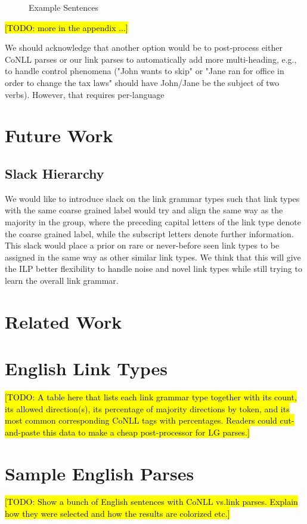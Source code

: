 \documentclass[11pt]{article}
\newcommand{\Note}[1]{}
\renewcommand{\Note}[1]{\hl{[#1]}}  %
\newcommand{\TODO}[1]{\Note{TODO: #1}}
\begin{document}
\begin{figure}[ht!]
  \centering
  
  \caption{Example Sentences}
\end{figure}

\TODO{more in the appendix ...}

We should acknowledge that another option would be to post-process either CoNLL parses or our link parses to automatically add more multi-heading, e.g., to handle control phenomena ("John wants to skip" or "Jane ran for office in order to change the tax laws" should have John/Jane be the subject of two verbs).  However, that requires per-language 



\section{Future Work}

\subsection{Slack Hierarchy}
We would like to introduce slack on the link grammar types such that link types with the same coarse grained label would try and align the same way as the majority in the group, where the preceding capital letters of the link type denote the coarse grained label, while the subscript letters denote further information. This slack would place a prior on rare or never-before seen link types to be assigned in the same way as other similar link types. We think that this will give the ILP better flexibility to handle noise and novel link types while still trying to learn the overall link grammar.





\section{Related Work}










\clearpage
\appendix
\section{English Link Types}

\TODO{A table here that lists each link grammar type together with its
  count, its allowed direction(s), its percentage of majority
  directions by token, and its most common corresponding CoNLL tags
  with percentages.  Readers could cut-and-paste this data to make a 
  cheap post-processor for LG parses.}

\section{Sample English Parses}

\TODO{Show a bunch of English sentences with CoNLL vs.\@ link parses.
  Explain how they were selected and how the results are colorized etc.}
\end{document}
